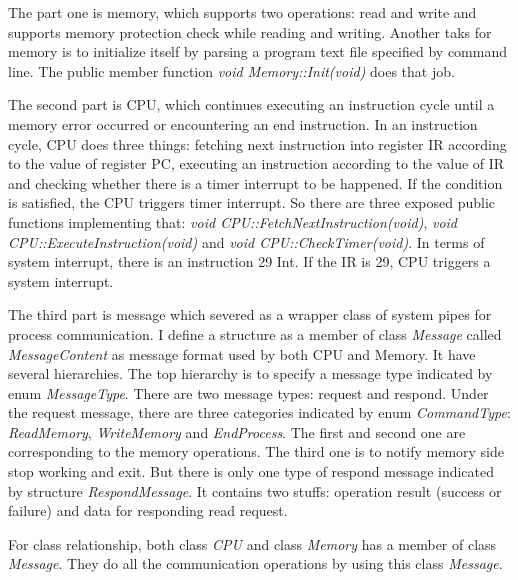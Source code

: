 \documentclass[a4paper]{report}
\begin{document}
The part one is memory, which supports two operations: read and write and supports memory protection check while reading and writing. Another taks for memory is to initialize itself by parsing a program text file specified by command line. The public member function \textit{\color{blue} void Memory::Init(void)} does that job.

The second part is CPU, which continues executing an instruction cycle until a memory error occurred or encountering an end instruction. In an instruction cycle, CPU does three things: fetching next instruction into register IR according to the value of register PC, executing an instruction according to the value of IR and checking whether there is a timer interrupt to be happened. If the condition is satisfied, the CPU triggers timer interrupt. So there are three exposed public functions implementing that: \textit{\color{blue} void CPU::FetchNextInstruction(void)}, \textit{\color{blue} void CPU::ExecuteInstruction(void)} and \textit{\color{blue} void CPU::CheckTimer(void)}. In terms of system interrupt, there is an instruction 29 Int. If the IR is 29, CPU triggers a system interrupt.

The third part is message which severed as a wrapper class of system pipes for process communication. I define a structure as a member of class \textit{\color{blue} Message} called \textit{\color{blue} MessageContent} as message format used by both CPU and Memory. It have several hierarchies. The top hierarchy is to specify a message type indicated by enum \textit{\color{blue} MessageType}. There are two message types: request and respond. Under the request message, there are three categories indicated by enum \textit{\color{blue} CommandType}: \textit{\color{blue} ReadMemory}, \textit{\color{blue} WriteMemory} and \textit{\color{blue} EndProcess}. The first and second one are corresponding to the memory operations. The third one is to notify memory side stop working and exit. But there is only one type of respond message indicated by structure \textit{\color{blue} RespondMessage}. It contains two stuffs: operation result (success or failure) and data for responding read request.

For class relationship, both class \textit{\color{blue} CPU} and class \textit{\color{blue} Memory} has a member of class \textit{\color{blue} Message}. They do all the communication operations by using this class \textit{\color{blue} Message}.
\end{document}
